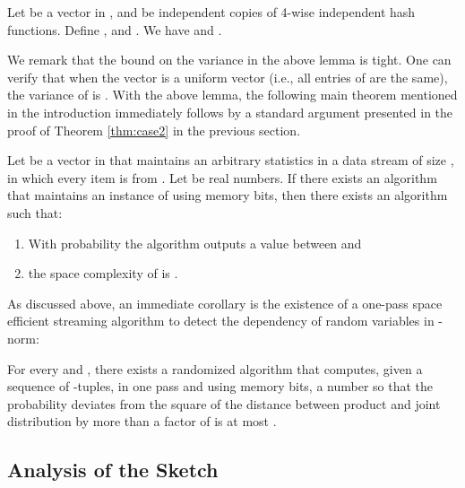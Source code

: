 \def\draft{0}  \documentclass[proceedings]{stacs}
\theoremstyle{plain}\newtheorem{satz}[thm]{Satz}
\theoremstyle{definition}\newtheorem{crucial}[thm]{Crucial Definition}
\begin{document}
\begin{lemma} \label{lem:main_lemma} Let  be a vector in , and  be independent copies of 4-wise independent hash functions. Define , and . We have  and .
\end{lemma}

We remark that the bound on the variance in the above lemma is tight. One can verify that when the vector  is a uniform vector (i.e., all entries of  are the same), the variance of  is . With the above lemma, the following main theorem mentioned in the introduction immediately follows by a standard argument presented in the proof of Theorem \ref{thm:case2} in the previous section.

\begin{theorem}\label{tm:main1}
Let  be a vector in  that maintains an arbitrary statistics in a data stream of size , in which every item is from . Let  be real numbers. If there exists an algorithm that maintains an instance of  using  memory bits, then
there exists an algorithm  such that:
\begin{enumerate}
\item With probability  the algorithm  outputs a value between  and
\item the space complexity of  is .
\end{enumerate}
\end{theorem}

As discussed above, an immediate corollary is the existence of a one-pass space efficient streaming algorithm to detect the dependency of  random variables in -norm:

\begin{corollary}For every  and , there exists a randomized algorithm that computes,
given a sequence  of -tuples, in one pass and using
 memory bits,
a number  so that the probability  deviates from the square of the 
distance between product and joint distribution by more than a factor of
 is at most .
\end{corollary}














\subsection{Analysis of the Sketch }\label{sec:analysis}
\end{document}
